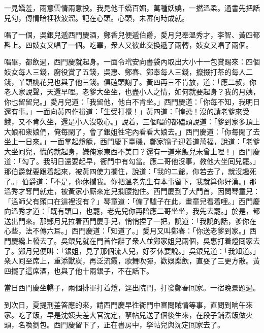 \begin{myquote} 
一見嬌羞，雨意雲情兩意投。我見他千嬌百媚，萬種妖嬈，一撚溫柔。通書先把話兒勾，傳情暗裡秋波溜。記在心頭。心頭，未審何時成就。
\end{myquote} 

唱了一個，吳銀兒遞西門慶酒，鄭香兒便遞伯爵，愛月兒奉溫秀才，李智、黃四都斟上。四妓女又唱了一個。吃畢，衆人又彼此交換遞了兩轉，妓女又唱了兩個。

唱畢，都飲過，西門慶就起身。一面令玳安向書袋內取出大小十一包賞賜來：四個妓女每人三錢，廚役賞了五錢，吳惠、鄭春、鄭奉每人三錢，攛掇打茶的每人二錢，丫頭桃花兒也與了他三錢。俱磕頭謝了。黃四再三不肯放，道：「應二叔，你老人家說聲，天還早哩。老爹大坐坐，也盡小人之情，如何就要起身？我的月姨，你也留留兒。」愛月兒道：「我留他，他白不肯坐。」西門慶道：「你每不知，我明日還有事。」一面向黃四作揖道：「生受打攪！」黃四道：「惶恐！沒的請老爹來受餓，又不肯久坐，還是小人沒敬心。」說着，三個唱的都磕頭說道：「爹到家多頂上大娘和衆娘們，俺每閑了，會了銀姐徃宅內看看大娘去。」西門慶道：「你每閑了去坐上一日來。」一面掌起燈籠，西門慶下臺磯，鄭家鴇子迎着道萬福，說道：「老爹大坐囘兒，慌的就起身，嫌俺家東西不美口？還有一道米飯兒未曾上哩！」西門慶道：「勾了。我明日還要起早，衙門中有勾當。應二哥他沒事，教他大坐囘兒罷。」那伯爵就要跟着起來，被黃四使力攔住，說道：「我的二爺，你若去了，就沒趣死了。」伯爵道：「不是，你休攔我。你把溫老先生有本事留下，我就算你好漢。」那溫秀才奪門就走，被黃家小厮來定兒攔腰抱住。{}西門慶到了大門首，因問琴童兒：「溫師父有頭口在這裡沒有？」琴童道：「備了驢子在此，畫童兒看着哩。」西門慶向溫秀才道：「既有頭口，也罷，老先兒你再陪應二哥坐坐，我先去罷。」於是，都送出門來。那鄭月兒拉着西門慶手兒，悄悄捏了一把，{}說道：「我說的話，爹你在心些，法不傳六耳。」西門慶道：「知道了。」愛月又叫鄭春：「你送老爹到家。」西門慶纔上轎去了。吳銀兒就在門首作辭了衆人並鄭家姐兒兩個，吳惠打着燈囘家去了。鄭月兒便叫：「銀姐，見了那個流人兒，{}好歹休要說。」吳銀兒道：「我知道。」衆人囘至席上，重添獸炭，再泛流霞，歌舞吹彈，歡娛樂飲，直耍了三更方散。黃四擺了這席酒，也與了他十兩銀子，不在話下。

當日西門慶坐轎子，兩個排軍打着燈，逕出院門，打發鄭春囘家。一宿晚景題過。

到次日，夏提刑差答應的來，請西門慶早徃衙門中審問賊情等事，直問到晌午來家。吃了飯，早是沈姨夫差大官沈定，拏帖兒送了個後生來，在段子鋪煮飯做火頭，名喚劉包。西門慶留下了，正在書房中，拏帖兒與沈定囘家去了。

